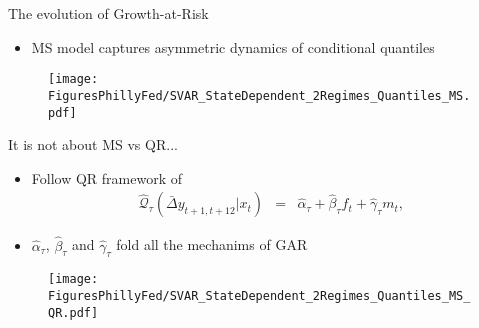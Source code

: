 \documentclass[xcolor=dvipsnames, xcolor=table, 10pt]{beamer}
\begin{document}

\begin{frame}{The evolution of Growth-at-Risk}
\begin{itemize}
\item MS model captures asymmetric dynamics of conditional quantiles
\end{itemize}
\centering
\begin{figure}
    \texttt{[image: FiguresPhillyFed/SVAR\_StateDependent\_2Regimes\_Quantiles\_MS.pdf]}
\end{figure}

\end{frame}


\begin{frame}{It is not about MS vs QR...}
\label{main:qrmodel}
\vspace*{-0.1in}
\begin{itemize}
\medskip
\item Follow QR framework of \cite{ABG19}
\begin{eqnarray*}
\widehat{\mathcal{Q}}_{\tau}(\bar{\Delta} {y}_{t+1,t+12}|x_t) &=& \hat{\alpha}_{\tau} + \hat{\beta}_{\tau} f_t + \hat{\gamma}_{\tau} m_t, \label{eq:GAR}
\end{eqnarray*}
\item $\hat{\alpha}_\tau$, $\hat{\beta}_\tau$ and $\hat{\gamma}_\tau$ fold all the mechanims of GAR \hyperlink{app:qrmodel}{}

\medskip
\end{itemize}
\vspace*{-0.2in}
\begin{figure}
    \texttt{[image: FiguresPhillyFed/SVAR\_StateDependent\_2Regimes\_Quantiles\_MS\_QR.pdf]}
\end{figure}
\end{frame}
\end{document}
